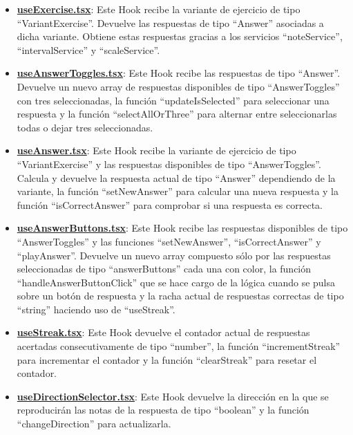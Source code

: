 \documentclass[12pt,twoside,titlepage]{report}
\begin{document}
\begin{itemize}
    \item \href{https://github.com/alberttogoca/EarFit/blob/main/src/hooks/useExercise.tsx}{\textbf{useExercise.tsx}}: Este Hook recibe la variante de ejercicio de tipo ``VariantExercise''. Devuelve las respuestas de tipo ``Answer\text{[]}'' asociadas a dicha variante. Obtiene estas respuestas gracias a los servicios ``noteService'', ``intervalService'' y ``scaleService''.
    \item \href{https://github.com/alberttogoca/EarFit/blob/main/src/hooks/useAnswerToggles.tsx}{\textbf{useAnswerToggles.tsx}}: Este Hook recibe las respuestas de tipo ``Answer\text{[]}''. Devuelve un nuevo array de respuestas disponibles de tipo ``AnswerToggles\text{[]}'' con tres seleccionadas, la función ``updateIsSelected'' para seleccionar una respuesta y la función ``selectAllOrThree'' para alternar entre seleccionarlas todas o dejar tres seleccionadas.
    \item \href{https://github.com/alberttogoca/EarFit/blob/main/src/hooks/useAnswer.tsx}{\textbf{useAnswer.tsx}}: Este Hook recibe la variante de ejercicio de tipo ``VariantExercise'' y las respuestas disponibles de tipo ``AnswerToggles\text{[]}''. Calcula y devuelve la respuesta actual de tipo ``Answer'' dependiendo de la variante, la función ``setNewAnswer'' para calcular una nueva respuesta y la función ``isCorrectAnswer'' para comprobar si una respuesta es correcta.
    \item \href{https://github.com/alberttogoca/EarFit/blob/main/src/hooks/useAnswerButtons.tsx}{\textbf{useAnswerButtons.tsx}}:  Este Hook recibe las respuestas disponibles de tipo ``AnswerToggles\text{[]}'' y las funciones ``setNewAnswer'', ``isCorrectAnswer'' y ``playAnswer''. Devuelve un nuevo array compuesto sólo por las respuestas seleccionadas de tipo ``answerButtons\text{[]}'' cada una con color, la función ``handleAnswerButtonClick'' que se hace cargo de la lógica cuando se pulsa sobre un botón de respuesta y la racha actual de respuestas correctas de tipo ``string'' haciendo uso de ``useStreak''.
    \item \href{https://github.com/alberttogoca/EarFit/blob/main/src/hooks/useStreak.tsx}{\textbf{useStreak.tsx}}: Este Hook devuelve el contador actual de respuestas acertadas consecutivamente de tipo ``number'', la función ``incrementStreak'' para incrementar el contador y la función ``clearStreak'' para resetar el contador.
    \item \href{https://github.com/alberttogoca/EarFit/blob/main/src/hooks/useDirectionSelector.tsx}{\textbf{useDirectionSelector.tsx}}: Este Hook devuelve la dirección en la que se reproducirán las notas de la respuesta de tipo ``boolean'' y la función ``changeDirection'' para actualizarla.

\end{itemize}
\end{document}
